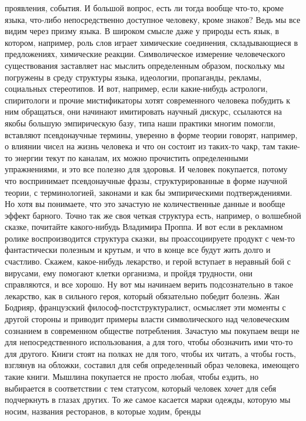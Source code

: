 проявления, события. И большой вопрос, есть ли тогда вообще что-то, кроме языка,
что-либо непосредственно доступное человеку, кроме знаков? Ведь мы все видим
через призму языка. В широком смысле даже у природы есть язык, в котором,
например, роль слов играет химические соединения, складывающиеся в предложениях,
химические реакции. Символическое измерение человеческого существования
заставляет нас мыслить определенным образом, поскольку мы погружены в среду
структуры языка, идеологии, пропаганды, рекламы, социальных стереотипов. И вот,
например, если какие-нибудь астрологи, спиритологи и прочие мистификаторы хотят
современного человека побудить к ним обращаться, они начинают имитировать
научный дискурс, ссылаются на якобы большую эмпирическую базу, типа наши
практики многим помогли, вставляют псевдонаучные термины, уверенно в форме
теории говорят, например, о влиянии чисел на жизнь человека и что он состоит из
таких-то чакр, там такие-то энергии текут по каналам, их можно прочистить
определенными упражнениями, и это все полезно для здоровья. И человек
покупается, потому что воспринимает псевдонаучные фразы, структурированные в
форме научной теории, с терминологией, законами и как бы эмпирическими
подтверждениями. Но хотя вы понимаете, что это зачастую не количественные данные
и вообще эффект барного. Точно так же своя четкая структура есть, например, о
волшебной сказке, почитайте какого-нибудь Владимира Проппа. И вот если в
рекламном ролике воспроизводится структура сказки, вы проассоциируете продукт с
чем-то фантастически полезным и крутым, и что в конце все будут жить долго и
счастливо. Скажем, какое-нибудь лекарство, и герой вступает в неравный бой с
вирусами, ему помогают клетки организма, и пройдя трудности, они справляются, и
все хорошо. Ну вот мы начинаем верить подсознательно в такое лекарство, как в
сильного героя, который обязательно победит болезнь. Жан Бодрияр, французский
философ-постструктуралист, осмысляет эти моменты с другой стороны и приводит
примеры власти символического над человеческим сознанием в современном обществе
потребления. Зачастую мы покупаем вещи не для непосредственного использования, а
для того, чтобы обозначить ими что-то для другого. Книги стоят на полках не для
того, чтобы их читать, а чтобы гость, взглянув на обложки, составил для себя
определенный образ человека, имеющего такие книги. Мышлина покупается не просто
любая, чтобы ездить, но выбирается в соответствии с тем статусом, который
человек хочет для себя подчеркнуть в глазах других. То же самое касается марки
одежды, которую мы носим, названия ресторанов, в которые ходим, бренды

